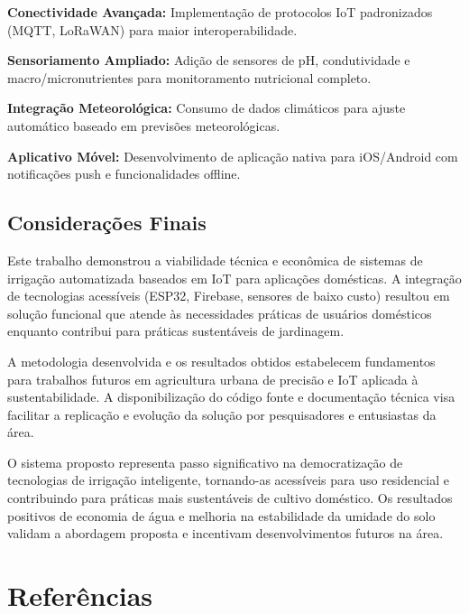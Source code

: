 \textbf{Conectividade Avançada:} Implementação de protocolos IoT padronizados (MQTT, LoRaWAN) para maior interoperabilidade.

\textbf{Sensoriamento Ampliado:} Adição de sensores de pH, condutividade e macro/micronutrientes para monitoramento nutricional completo.

\textbf{Integração Meteorológica:} Consumo de dados climáticos para ajuste automático baseado em previsões meteorológicas.

\textbf{Aplicativo Móvel:} Desenvolvimento de aplicação nativa para iOS/Android com notificações push e funcionalidades offline.

\section{Considerações Finais}

Este trabalho demonstrou a viabilidade técnica e econômica de sistemas de irrigação automatizada baseados em IoT para aplicações domésticas. A integração de tecnologias acessíveis (ESP32, Firebase, sensores de baixo custo) resultou em solução funcional que atende às necessidades práticas de usuários domésticos enquanto contribui para práticas sustentáveis de jardinagem.

A metodologia desenvolvida e os resultados obtidos estabelecem fundamentos para trabalhos futuros em agricultura urbana de precisão e IoT aplicada à sustentabilidade. A disponibilização do código fonte e documentação técnica visa facilitar a replicação e evolução da solução por pesquisadores e entusiastas da área.

O sistema proposto representa passo significativo na democratização de tecnologias de irrigação inteligente, tornando-as acessíveis para uso residencial e contribuindo para práticas mais sustentáveis de cultivo doméstico. Os resultados positivos de economia de água e melhoria na estabilidade da umidade do solo validam a abordagem proposta e incentivam desenvolvimentos futuros na área.

\chapter{Referências}


